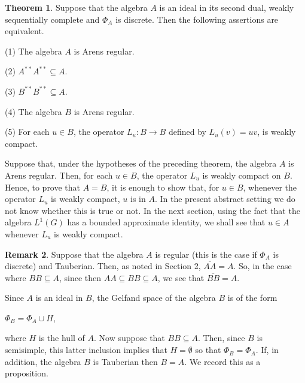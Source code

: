\documentclass[12pt, twoside, leqno]{article}
\theoremstyle{definition}
\newtheorem{theorem}{Theorem}[section]
\newtheorem{remark}[theorem]{Remark}
\theoremstyle{definition}
\numberwithin{equation}{section}
\begin{document}
\begin{theorem} Suppose that the algebra $ A $ is an ideal in its second dual, weakly sequentially complete and $ \Phi_{A} $ is discrete. Then the following assertions are equivalent.\vspace{2mm}
	
	(1) The algebra $ A $ is Arens regular.\vspace{2mm}
	
	(2) $ A^{**}A^{**}\subseteq A $.\vspace{2mm}
	
	(3) $ B^{**}B^{**}\subseteq A $.\vspace{2mm}
	
	(4) The algebra $ B $ is Arens regular.\vspace{2mm}
	
	(5) For each $ u\in B $, the operator $ L_{u}:B\rightarrow B $ defined by $ L_{u}(v)=uv $, is weakly compact.
	
\end{theorem}
Suppose that, under the hypotheses of the preceding theorem, the algebra $ A $ is Arens regular. Then, for each $ u\in B $, the operator $ L_{u} $ is weakly compact on $ B $. Hence, to prove that $ A=B $, it is enough to show that, for $ u\in B $, whenever the operator $ L_{u} $ is weakly compact, $ u $ is in $ A $. In the present abstract setting we do not know whether this is true or not. In the next section, using the fact that the algebra $ L^{1}(G) $ has a bounded approximate identity, we shall see that $ u\in A $ whenever $ L_{u} $ is weakly compact.\vspace{2mm}
 
	\begin{remark}Suppose that the algebra $ A $ is regular (this is the case if $ \Phi_{A} $ is discrete) and Tauberian. Then, as noted in Section 2, $\overline{AA}=A $. So, in the case where $ BB\subseteq A $, since then $ AA\subseteq BB\subseteq A $, we see that  $ \overline{BB}=A $.
\end{remark}
Since $ A $ is an ideal in $ B $, the Gelfand space of the algebra $ B $ is of the form\vspace{3mm}

$ \Phi_{B}=\Phi_{A}\cup H $,\vspace{3mm} 

\noindent where $ H $ is the hull of $ A $. Now suppose that $ BB\subseteq A $. Then, since $ B $ is semisimple, this latter inclusion implies that $ H=\emptyset $ so that $ \Phi_{B}=\Phi_{A} $. If, in addition, the algebra $ B $ is Tauberian then $ B=A $. We record this as a proposition.
\end{document}
